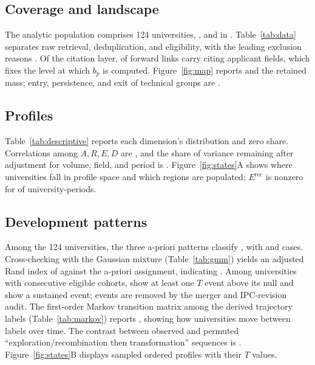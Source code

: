 \subsection{Coverage and landscape}
The analytic population comprises 124 universities, , and  in .
Table~\ref{tab:data} separates raw retrieval, deduplication, and eligibility,
with the leading exclusion reasons . Of the citation
layer,  of forward links carry citing applicant fields, which
fixes the level at which $b_p$ is computed. Figure~\ref{fig:map} reports
 and the retained mass; entry,
persistence, and exit of technical groups are .


\subsection{Profiles}
Table~\ref{tab:descriptive} reports each dimension's distribution and zero
share. Correlations among $A,R,E,D$ are ,
and the share of variance remaining after adjustment for volume, field, and
period is . Figure~\ref{fig:states}A shows where universities
fall in profile space and which regions are populated; $E^{\mathrm{rec}}$ is
nonzero for  of university-periods.


\subsection{Development patterns}
Among the 124 universities, the three a-priori patterns classify
, with  and  cases.
Cross-checking with the Gaussian mixture (Table~\ref{tab:gmm}) yields an
adjusted Rand index of  against the a-priori assignment,
indicating . Among  universities with
consecutive eligible cohorts,  show at least one $T$ event
above its null and  show a sustained event; 
events are removed by the merger and IPC-revision audit. The first-order Markov transition matrix among the derived trajectory labels
(Table~\ref{tab:markov}) reports , showing how
universities move between labels over time. The contrast between observed and
permuted ``exploration/recombination
then transformation'' sequences is .
Figure~\ref{fig:states}B displays sampled ordered profiles with their $T$
values.




